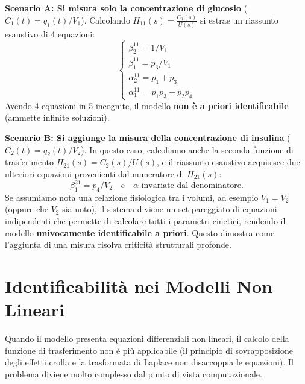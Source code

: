 \textbf{Scenario A: Si misura solo la concentrazione di glucosio} ($C_1(t) = q_1(t)/V_1$).
Calcolando $H_{11}(s) = \frac{C_1(s)}{U(s)}$ si estrae un riassunto esaustivo di 4 equazioni:
\begin{equation}
\begin{cases}
\beta_2^{11} = 1/V_1 \\
\beta_1^{11} = p_3/V_1 \\
\alpha_2^{11} = p_1 + p_3 \\
\alpha_1^{11} = p_1 p_3 - p_2 p_4
\end{cases}
\end{equation}
Avendo 4 equazioni in 5 incognite, il modello \textbf{non è a priori identificabile} (ammette infinite soluzioni).

\textbf{Scenario B: Si aggiunge la misura della concentrazione di insulina} ($C_2(t) = q_2(t)/V_2$).
In questo caso, calcoliamo anche la seconda funzione di trasferimento $H_{21}(s) = C_2(s)/U(s)$, e il riassunto esaustivo acquisisce due ulteriori equazioni provenienti dal numeratore di $H_{21}(s)$:
\begin{equation}
\beta_1^{21} = p_4 / V_2 \quad \text{e} \quad \alpha \text{ invariate dal denominatore.}
\end{equation}
Se assumiamo nota una relazione fisiologica tra i volumi, ad esempio $V_1 = V_2$ (oppure che $V_2$ sia noto), il sistema diviene un set pareggiato di equazioni indipendenti che permette di calcolare tutti i parametri cinetici, rendendo il modello \textbf{univocamente identificabile a priori}. Questo dimostra come l'aggiunta di una misura risolva criticità strutturali profonde.

\section{Identificabilità nei Modelli Non Lineari}

Quando il modello presenta equazioni differenziali non lineari, il calcolo della funzione di trasferimento non è più applicabile (il principio di sovrapposizione degli effetti crolla e la trasformata di Laplace non disaccoppia le equazioni). Il problema diviene molto complesso dal punto di vista computazionale.

